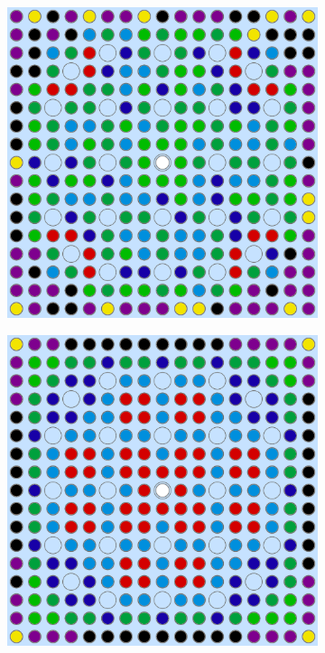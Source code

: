 \begin{figure}[h!]
\begin{subfigure}{0.48\textwidth}
  \caption{}
  \label{fig:chap10-assm-16-combined-4}
\end{subfigure}
\begin{subfigure}{0.48\textwidth}
  \centering
  \includegraphics[width=0.9\linewidth]{figures/unsupervised/geometries/with-features/8-clusters/pinch/assm-16}
  \caption{}
  \label{fig:chap10-assm-16-pinch-8}
\end{subfigure}%
\begin{subfigure}{0.48\textwidth}
  \centering
  \includegraphics[width=0.9\linewidth]{figures/unsupervised/geometries/with-features/8-clusters/combined/assm-16}

\end{subfigure}
\end{figure}
